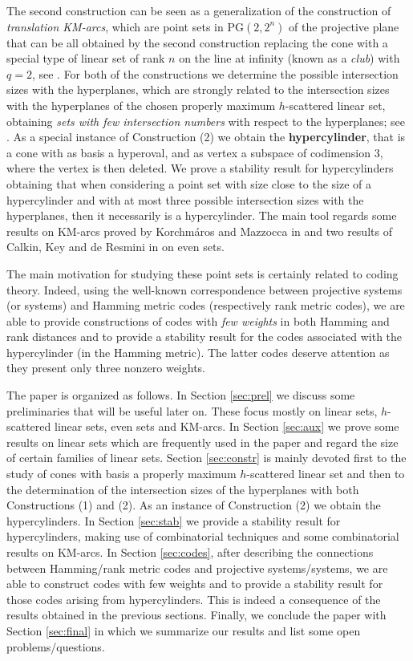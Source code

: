 \documentclass[11pt]{amsart}
\newcommand{\PG}{\mathrm{PG}}
\begin{document}
The second construction can be seen as a generalization of the construction of \emph{translation KM-arcs}, which are point sets in $\PG(2,2^n)$ of the projective plane that can be all obtained by the second construction replacing the cone with a special type of linear set of rank $n$ on the line at infinity (known as a \emph{club}) with $q=2$, see \cite[Theorem 2.1]{deboeck2016linear}.
For both of the constructions we determine the possible intersection sizes with the hyperplanes, which are strongly related to the intersection sizes with the hyperplanes of the chosen properly maximum $h$-scattered linear set, obtaining \emph{sets with few intersection numbers} with respect to the hyperplanes; see \cite{de2011constructions}.
As a special instance of Construction (2) we obtain the \textbf{hypercylinder}, that is a cone with as basis a hyperoval, and as vertex a subspace of codimension 3, where the vertex is then deleted. We prove a stability result for hypercylinders obtaining that when considering a point set with size close to the size of a hypercylinder and with at most three possible intersection sizes with the hyperplanes, then it necessarily is a hypercylinder. The main tool regards some results on KM-arcs proved by Korchm\'aros and Mazzocca in \cite{korchmaros1990on} and two results of Calkin, Key and de Resmini in \cite{calkin1999minimumweight} on even sets.

The main motivation for studying these point sets is certainly related to coding theory. Indeed, using the well-known correspondence between projective systems (or systems) and Hamming metric codes (respectively rank metric codes), we are able to provide constructions of codes with \emph{few weights} in both Hamming and rank distances and to provide a stability result for the codes associated with the hypercylinder (in the Hamming metric). 
The latter codes deserve attention as they present only three nonzero weights.


The paper is organized as follows. In Section \ref{sec:prel} we discuss some preliminaries that will be useful later on. These focus mostly on linear sets, $h$-scattered linear sets, even sets and KM-arcs. In Section \ref{sec:aux} we prove some results on linear sets which are frequently used in the paper and regard the size of certain families of linear sets.
Section \ref{sec:constr} is mainly devoted first to the study of cones with basis a properly maximum $h$-scattered linear set and then to the determination of the intersection sizes of the hyperplanes with both Constructions (1) and (2).
As an instance of Construction (2) we obtain the hypercylinders. In Section \ref{sec:stab} we provide a stability result for hypercylinders, making use of combinatorial techniques and some combinatorial results on KM-arcs. In Section \ref{sec:codes}, after describing the connections between Hamming/rank metric codes and projective systems/systems, we are able to construct codes with few weights and to provide a stability result for those codes arising from hypercylinders. This is indeed a consequence of the results obtained in the previous sections. Finally, we conclude the paper with Section \ref{sec:final} in which we summarize our results and list some open problems/questions.
\end{document}
